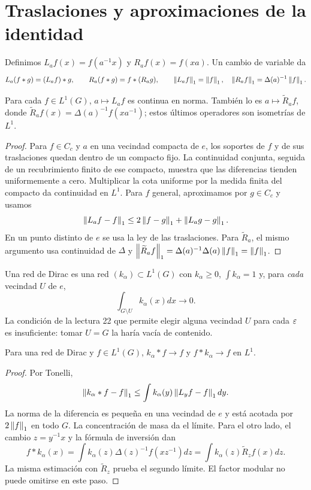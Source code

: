 \section{Traslaciones y aproximaciones de la identidad}
Definimos $L_af(x)=f(a^{-1}x)$ y $R_af(x)=f(xa)$. Un cambio de variable da
\[
 L_a(f*g)=(L_af)*g,\qquad R_a(f*g)=f*(R_ag),\qquad
 \left\lVert L_af\right\rVert_1=\left\lVert f\right\rVert_1,\quad\left\lVert R_af\right\rVert_1=\Delta(a)^{-1}\left\lVert f\right\rVert_1.
\]
\begin{lema}\label{v4-l24-l:translation}
Para cada $f\in L^1(G)$, $a\mapsto L_af$ es continua en norma. También lo es $a\mapsto\widetilde R_af$, donde $\widetilde R_af(x)=\Delta(a)^{-1}f(xa^{-1})$; estos últimos operadores son isometrías de $L^1$.
\end{lema}
\begin{proof}
Para $f\in C_c$ y $a$ en una vecindad compacta de $e$, los soportes de $f$ y de sus traslaciones quedan dentro de un compacto fijo. La continuidad conjunta, seguida de un recubrimiento finito de ese compacto, muestra que las diferencias tienden uniformemente a cero. Multiplicar la cota uniforme por la medida finita del compacto da continuidad en $L^1$. Para $f$ general, aproximamos por $g\in C_c$ y usamos
\[
 \left\lVert L_af-f\right\rVert_1\leq2\left\lVert f-g\right\rVert_1+\left\lVert L_ag-g\right\rVert_1.
\]
En un punto distinto de $e$ se usa la ley de las traslaciones. Para $\widetilde R_a$, el mismo argumento usa continuidad de $\Delta$ y
$\left\lVert\widetilde R_af\right\rVert_1=\Delta(a)^{-1}\Delta(a)\left\lVert f\right\rVert_1=\left\lVert f\right\rVert_1$.
\end{proof}
\begin{definicion}
Una red de Dirac es una red $(k_\alpha)\subset L^1(G)$ con $k_\alpha\geq0$, $\int k_\alpha=1$ y, para \emph{cada} vecindad $U$ de $e$,
\[
 \int_{G\setminus U}k_\alpha(x)dx\longrightarrow0.
\]
La condición de la lectura 22 que permite elegir alguna vecindad $U$ para cada $\varepsilon$ es insuficiente: tomar $U=G$ la haría vacía de contenido.
\end{definicion}
\begin{teorema}\label{v4:dirac-grupo}
Para una red de Dirac y $f\in L^1(G)$, $k_\alpha*f\to f$ y $f*k_\alpha\to f$ en $L^1$.
\end{teorema}
\begin{proof}
Por Tonelli,
\[
 \left\lVert k_\alpha*f-f\right\rVert_1\leq\int k_\alpha(y)\left\lVert L_yf-f\right\rVert_1dy.
\]
La norma de la diferencia es pequeña en una vecindad de $e$ y está acotada por $2\left\lVert f\right\rVert_1$ en todo $G$. La concentración de masa da el límite. Para el otro lado, el cambio $z=y^{-1}x$ y la fórmula de inversión dan
\[
 f*k_\alpha(x)=\int k_\alpha(z)\Delta(z)^{-1}f(xz^{-1})dz
 =\int k_\alpha(z)\widetilde R_zf(x)dz.
\]
La misma estimación con $\widetilde R_z$ prueba el segundo límite. El factor modular no puede omitirse en este paso.
\end{proof}
